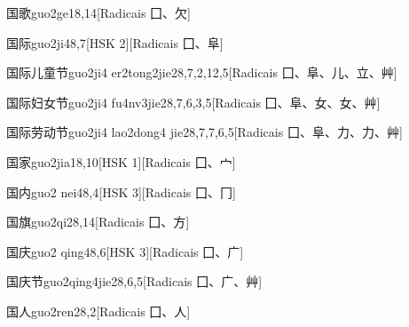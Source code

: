 \begin{entry}{国歌}{guo2ge1}{8,14}[Radicais ⼞、⽋]
\end{entry}

\begin{entry}{国际}{guo2ji4}{8,7}[HSK 2][Radicais ⼞、⾩]
\end{entry}

\begin{entry}{国际儿童节}{guo2ji4 er2tong2jie2}{8,7,2,12,5}[Radicais ⼞、⾩、⼉、⽴、⾋]
\end{entry}

\begin{entry}{国际妇女节}{guo2ji4 fu4nv3jie2}{8,7,6,3,5}[Radicais ⼞、⾩、⼥、⼥、⾋]
\end{entry}

\begin{entry}{国际劳动节}{guo2ji4 lao2dong4 jie2}{8,7,7,6,5}[Radicais ⼞、⾩、⼒、⼒、⾋]
\end{entry}

\begin{entry}{国家}{guo2jia1}{8,10}[HSK 1][Radicais ⼞、⼧]
\end{entry}

\begin{entry}{国内}{guo2 nei4}{8,4}[HSK 3][Radicais ⼞、⼌]
\end{entry}

\begin{entry}{国旗}{guo2qi2}{8,14}[Radicais ⼞、⽅]
\end{entry}

\begin{entry}{国庆}{guo2 qing4}{8,6}[HSK 3][Radicais ⼞、⼴]
\end{entry}

\begin{entry}{国庆节}{guo2qing4jie2}{8,6,5}[Radicais ⼞、⼴、⾋]
\end{entry}

\begin{entry}{国人}{guo2ren2}{8,2}[Radicais ⼞、⼈]
\end{entry}

